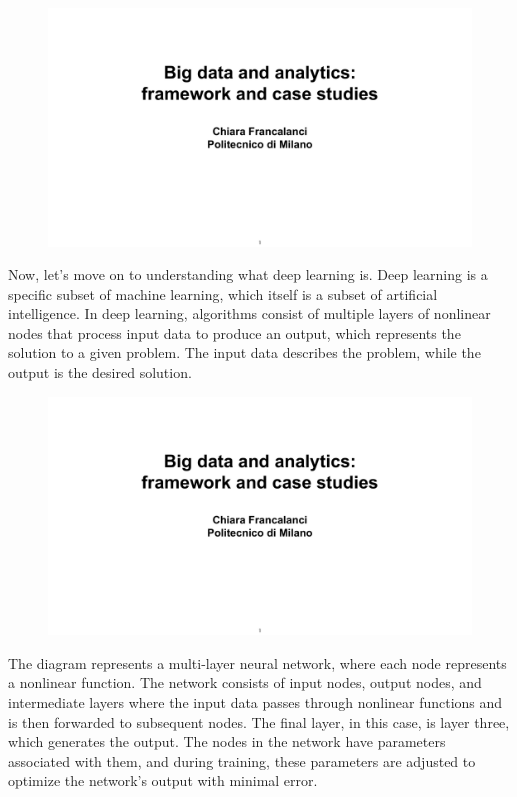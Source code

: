 \begin{figure}[!h]
    \centering
    \includegraphics[page=8, trim = 1.5cm 5.5cm 1.5cm 4cm, clip, width=\textwidth]{images/06 - BIG_DATA.pdf}
\end{figure}

Now, let's move on to understanding what deep learning is. Deep learning
is a specific subset of machine learning, which itself is a subset of
artificial intelligence. In deep learning, algorithms consist of
multiple layers of nonlinear nodes that process input data to produce an
output, which represents the solution to a given problem. The input data
describes the problem, while the output is the desired solution.

\begin{figure}[!h]
    \centering
    \includegraphics[page=9, trim = 1.5cm 2cm 1.5cm 4cm, clip, width=\textwidth]{images/06 - BIG_DATA.pdf}
\end{figure}

The diagram represents a multi-layer neural network, where each node
represents a nonlinear function. The network consists of input nodes,
output nodes, and intermediate layers where the input data passes
through nonlinear functions and is then forwarded to subsequent nodes.
The final layer, in this case, is layer three, which generates the
output. The nodes in the network have parameters associated with them,
and during training, these parameters are adjusted to optimize the
network's output with minimal error.


